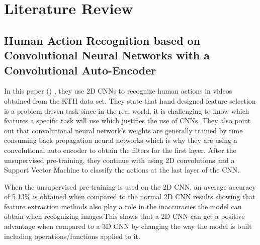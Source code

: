  \par

\section{Literature Review}

\subsection{Human Action Recognition based on Convolutional Neural Networks
with a Convolutional Auto-Encoder}
 \vspace{0.1in}

\par
In this paper (\cite{geng2015human}) , they use 2D CNNs to recognize human actions in videos obtained from the KTH data set. They state that hand designed feature selection is a problem driven task since in the real world, it is challenging to know which features a specific task will use which justifies the use of CNNs. They also point out that convolutional neural network's weights are generally trained by time consuming back propagation neural networks which is why they are using a convolutional auto encoder to obtain the filters for the first layer. After the unsupervised pre-training, they continue with using 2D convolutions and a Support Vector Machine to classify the actions at the last layer of the CNN.\vspace{0.1in} 

When the unsupervised pre-training is used on the 2D CNN, an average accuracy of 5.13\% is obtained when compared to the normal 2D CNN results showing that feature extraction methods also play a role in the inaccuracies the model can obtain when recognizing images.This shows that a 2D CNN can get a positive advantage when compared to a 3D CNN by changing the way the model is built including operations/functions applied to it.

\par

